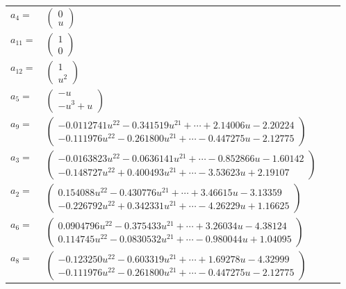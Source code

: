 \documentclass[1p]{elsarticle_modified}
\theoremstyle{definition}
\begin{document}
\begin{tabular}{m{7pt} m{180pt} m{7pt} m{180pt} }
\flushright $a_{4}=$&$\begin{pmatrix}0\\u\end{pmatrix}$ \\
\flushright $a_{11}=$&$\begin{pmatrix}1\\0\end{pmatrix}$ \\
\flushright $a_{12}=$&$\begin{pmatrix}1\\u^2\end{pmatrix}$ \\
\flushright $a_{5}=$&$\begin{pmatrix}- u\\- u^3+u\end{pmatrix}$ \\
\flushright $a_{9}=$&$\begin{pmatrix}-0.0112741 u^{22}-0.341519 u^{21}+\cdots+2.14006 u-2.20224\\-0.111976 u^{22}-0.261800 u^{21}+\cdots-0.447275 u-2.12775\end{pmatrix}$ \\
\flushright $a_{3}=$&$\begin{pmatrix}-0.0163823 u^{22}-0.0636141 u^{21}+\cdots-0.852866 u-1.60142\\-0.148727 u^{22}+0.400493 u^{21}+\cdots-3.53623 u+2.19107\end{pmatrix}$ \\
\flushright $a_{2}=$&$\begin{pmatrix}0.154088 u^{22}-0.430776 u^{21}+\cdots+3.46615 u-3.13359\\-0.226792 u^{22}+0.342331 u^{21}+\cdots-4.26229 u+1.16625\end{pmatrix}$ \\
\flushright $a_{6}=$&$\begin{pmatrix}0.0904796 u^{22}-0.375433 u^{21}+\cdots+3.26034 u-4.38124\\0.114745 u^{22}-0.0830532 u^{21}+\cdots-0.980044 u+1.04095\end{pmatrix}$ \\
\flushright $a_{8}=$&$\begin{pmatrix}-0.123250 u^{22}-0.603319 u^{21}+\cdots+1.69278 u-4.32999\\-0.111976 u^{22}-0.261800 u^{21}+\cdots-0.447275 u-2.12775\end{pmatrix}$ \\

\end{tabular}
\end{document}
